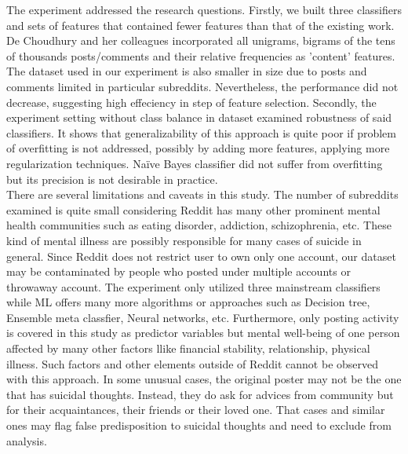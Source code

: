 The experiment addressed the research questions. Firstly, we built three classifiers and sets of features that contained fewer features than that of the existing work. De Choudhury and her colleagues \cite{DeChoudhury2016} incorporated all unigrams, bigrams of the tens of thousands posts/comments and their relative frequencies as 'content' features. The dataset used in our experiment is also smaller in size due to posts and comments limited in particular subreddits. Nevertheless, the performance did not decrease, suggesting high effeciency in step of feature selection. Secondly, the experiment setting without class balance in dataset examined robustness of said classifiers. It shows that generalizability of this approach is quite poor if problem of overfitting is not addressed, possibly by adding more features, applying more regularization techniques. Na\"ive Bayes classifier did not suffer from overfitting but its precision is not desirable in practice.\\
There are several limitations and caveats in this study. The number of subreddits examined is quite small considering Reddit has many other prominent mental health communities such as eating disorder, addiction, schizophrenia, etc. These kind of mental illness are possibly responsible for many cases of suicide in general. Since Reddit does not restrict user to own only one account, our dataset may be contaminated by people who posted under multiple accounts or throwaway account. The experiment only utilized three mainstream classifiers while ML offers many more algorithms or approaches such as Decision tree,  Ensemble meta classfier, Neural networks, etc. Furthermore, only posting activity is covered in this study as predictor variables but mental well-being of one person affected by many other factors llike financial stability, relationship, physical illness. Such factors and other elements outside of Reddit cannot be observed with this approach. In some unusual cases, the original poster may not be the one that has suicidal thoughts. Instead, they do ask for advices from community but for their acquaintances, their friends or their loved one. That cases and similar ones may flag false predisposition to suicidal thoughts and need to exclude from analysis.\\
